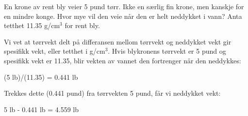 

En krone av rent bly veier 5 pund tørr.  Ikke en særlig fin krone, men kanskje for en mindre konge.  Hvor mye vil den veie når den er helt neddykket i vann?  Anta tetthet 11.35 g/cm$^{3}$ for rent bly.







Vi vet at tørrvekt delt på differansen mellom tørrvekt og neddykket vekt gir spesifikk vekt, eller tetthet i g/cm$^{3}$.  Hvis blykronens tørrvekt er 5 pund og spesifikk vekt er 11.35, blir vekten av vannet den fortrenger når den neddykkes:

\vskip 10pt

(5 lb)/(11.35) = 0.441 lb

\vskip 10pt

Trekkes dette (0.441 pund) fra tørrvekten 5 pund, får vi neddykket vekt:

\vskip 10pt

5 lb - 0.441 lb = 4.559 lb









